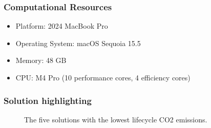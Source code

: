 \begin{frame}
    \frametitle{Computational Resources}

    \begin{itemize}
        \item Platform: 2024 MacBook Pro
        \item Operating System: macOS Sequoia 15.5
        \item Memory: 48 GB
        \item CPU: M4 Pro (10 performance cores, 4 efficiency cores)
    \end{itemize}
\end{frame}


\begin{frame}
    \frametitle{Solution highlighting}
    \begin{figure}
        \centering
        \resizebox{\columnwidth}{!}{}
        \caption{The five solutions with the lowest lifecycle CO2 emissions.}
    \end{figure}
\end{frame}
